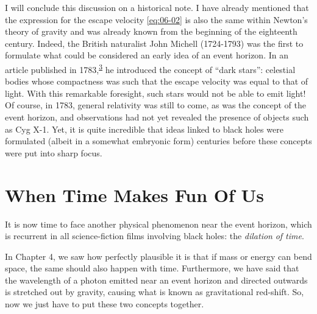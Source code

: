 I will conclude this discussion on a historical note. I have already mentioned that the
expression for the escape velocity \eqref{eq:06-02} is also the same within
Newton's theory of gravity and was already known from the beginning of the eighteenth
century. Indeed, the British naturalist John Michell (1724-1793) was
the first to formulate what could be considered an early idea of an event horizon. In an
article published in 1783,\textsuperscript{\hyperlink{note:06-03}{3}} he introduced the concept of ``dark
stars'': celestial bodies whose compactness was such that the escape velocity was equal
to that of light. With this remarkable foresight, such stars would not be able to emit
light! Of course, in 1783, general relativity was still to come, as was the concept of
the event horizon, and observations had not yet revealed the presence of objects such as
Cyg X-1. Yet, it is quite incredible that ideas linked to black holes
were formulated (albeit in a somewhat embryonic form) centuries before these concepts
were put into sharp focus.

\section{When Time Makes Fun Of Us}\label{sec:06-time}

It is now time to face another physical phenomenon near the event horizon, which is
recurrent in all science-fiction films involving black holes: the
\emph{dilation} \emph{of time}.

In Chapter 4, we saw how perfectly plausible it is that if mass or energy can bend
space, the same should also happen with time. Furthermore, we have said that the
wavelength of a photon emitted near an event horizon and directed
outwards is stretched out by gravity, causing what is known as gravitational
red-shift. So, now we just have to put these two concepts together.

